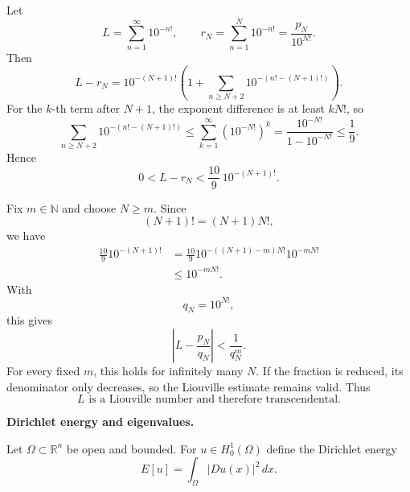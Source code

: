 \begin{solution}
Let
\[
L=\sum_{n=1}^{\infty}10^{-n!},
\qquad
r_N=\sum_{n=1}^{N}10^{-n!}
=\frac{p_N}{10^{N!}}.
\]
Then
\[
L-r_N
=
10^{-(N+1)!}
\left(
1+
\sum_{n\ge N+2}
10^{-(n!-(N+1)!)}
\right).
\]
For the \(k\)-th term after \(N+1\), the exponent difference is at least \(kN!\), so
\[
\sum_{n\ge N+2}
10^{-(n!-(N+1)!)}
\le
\sum_{k=1}^{\infty}
(10^{-N!})^k
=
\frac{10^{-N!}}{1-10^{-N!}}
\le
\frac19.
\]
Hence
\[
\boxed{
0<L-r_N
<
\frac{10}{9}\,10^{-(N+1)!}.
}
\]

Fix \(m\in\mathbb N\) and choose \(N\ge m\). Since
\[
(N+1)!
=
(N+1)N!,
\]
we have
\[
\begin{aligned}
\frac{10}{9}10^{-(N+1)!}
&=
\frac{10}{9}
10^{-((N+1)-m)N!}
10^{-mN!}\\
&\le
10^{-mN!}.
\end{aligned}
\]
With
\[
q_N=10^{N!},
\]
this gives
\[
\left|
L-\frac{p_N}{q_N}
\right|
<
\frac1{q_N^m}.
\]
For every fixed \(m\), this holds for infinitely many \(N\). If the fraction is reduced,
its denominator only decreases, so the Liouville estimate remains valid. Thus
\[
\boxed{
L\text{ is a Liouville number and therefore transcendental}.
}
\]
\end{solution}


\begin{problem}[CP-II-0446]
\label{prob:cp-ii-0446}
\textbf{Dirichlet energy and eigenvalues.}

\hspace*{1.5em}Let $\Omega\subset\mathbb{R}^n$ be open and bounded. For $u\in H_0^1(\Omega)$
define the Dirichlet energy
\[
E[u] = \int_\Omega |Du(x)|^2\,dx.
\]
\end{problem}

